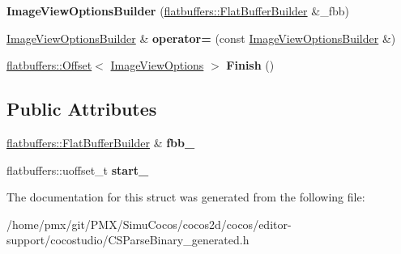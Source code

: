 \begin{DoxyCompactItemize}
{\bfseries Image\+View\+Options\+Builder} (\hyperlink{classflatbuffers_1_1FlatBufferBuilder}{flatbuffers\+::\+Flat\+Buffer\+Builder} \&\+\_\+fbb)
\item 
\mbox{\label{structflatbuffers_1_1ImageViewOptionsBuilder_af9a0d2e18f8de19e5db3c657ddb43a43}} 
\hyperlink{structflatbuffers_1_1ImageViewOptionsBuilder}{Image\+View\+Options\+Builder} \& {\bfseries operator=} (const \hyperlink{structflatbuffers_1_1ImageViewOptionsBuilder}{Image\+View\+Options\+Builder} \&)
\item 
\mbox{\label{structflatbuffers_1_1ImageViewOptionsBuilder_a4465e1485684725db29a29aeee8addf9}} 
\hyperlink{structflatbuffers_1_1Offset}{flatbuffers\+::\+Offset}$<$ \hyperlink{structflatbuffers_1_1ImageViewOptions}{Image\+View\+Options} $>$ {\bfseries Finish} ()
\end{DoxyCompactItemize}
\subsection*{Public Attributes}
\begin{DoxyCompactItemize}
\item 
\mbox{\label{structflatbuffers_1_1ImageViewOptionsBuilder_ad8751f6293bafa0def60e8117337f105}} 
\hyperlink{classflatbuffers_1_1FlatBufferBuilder}{flatbuffers\+::\+Flat\+Buffer\+Builder} \& {\bfseries fbb\+\_\+}
\item 
\mbox{\label{structflatbuffers_1_1ImageViewOptionsBuilder_aebb572339605d2048fa000296e2239a9}} 
flatbuffers\+::uoffset\+\_\+t {\bfseries start\+\_\+}
\end{DoxyCompactItemize}


The documentation for this struct was generated from the following file\+:\begin{DoxyCompactItemize}
\item 
/home/pmx/git/\+P\+M\+X/\+Simu\+Cocos/cocos2d/cocos/editor-\/support/cocostudio/C\+S\+Parse\+Binary\+\_\+generated.\+h\end{DoxyCompactItemize}
